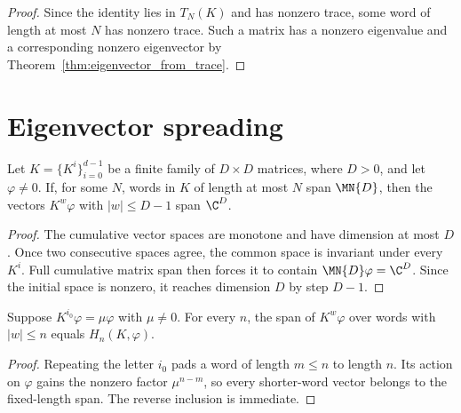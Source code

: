 \begin{proof}
    \leanok
    Since the identity lies in $T_N(K)$ and has nonzero trace, some word of
    length at most $N$ has nonzero trace. Such a matrix has a nonzero
    eigenvalue and a corresponding nonzero eigenvector by
    Theorem~\ref{thm:eigenvector_from_trace}.
\end{proof}

\section{Eigenvector spreading}

\begin{theorem}
    \label{thm:kraus_cumulative_eigenvector_spreading}
    \leanok
    Let $K=\{K^i\}_{i=0}^{d-1}$ be a finite family of $D\times D$ matrices,
    where $D>0$, and let $\varphi\neq0$. If, for some $N$, words in $K$ of length at most $N$
    span $\MN{D}$, then the vectors $K^w\varphi$ with $|w|\leq D-1$ span
    $\C^D$.
\end{theorem}

\begin{proof}\leanok
    The cumulative vector spaces are monotone and have dimension at most $D$.
    Once two consecutive spaces agree, the common space is invariant under
    every $K^i$. Full cumulative matrix span then forces it to contain
    $\MN{D}\varphi=\C^D$. Since the initial space is nonzero, it reaches
    dimension $D$ by step $D-1$.
\end{proof}

\begin{lemma}
    \label{lem:kraus_eigenvector_padding}
    \leanok
    Suppose $K^{i_0}\varphi=\mu\varphi$ with $\mu\neq0$. For every $n$, the
    span of $K^w\varphi$ over words with $|w|\leq n$ equals
    $H_n(K,\varphi)$.
\end{lemma}

\begin{proof}\leanok
    Repeating the letter $i_0$ pads a word of length $m\leq n$ to length $n$.
    Its action on $\varphi$ gains the nonzero factor $\mu^{n-m}$, so every
    shorter-word vector belongs to the fixed-length span. The reverse inclusion
    is immediate.
\end{proof}

